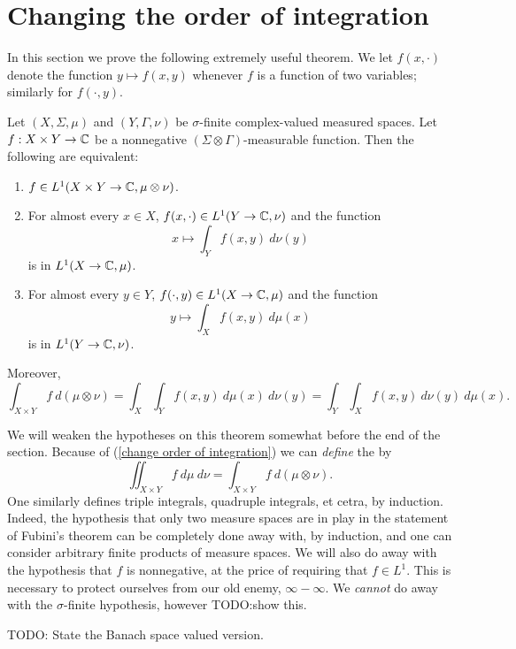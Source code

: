 \section{Changing the order of integration}
In this section we prove the following extremely useful theorem.
We let $f(x, \cdot)$ denote the function $y \mapsto f(x, y)$ whenever $f$ is a function of two variables; similarly for $f(\cdot, y)$.
\begin{theorem}[Fubini]
Let $(X, \Sigma, \mu)$ and $(Y, \Gamma, \nu)$ be $\sigma$-finite complex-valued measured spaces.
Let $f: X \times Y \to \mathbb{C}$ be a nonnegative $(\Sigma \otimes \Gamma)$-measurable function.
Then the following are equivalent:
\begin{enumerate}
\item $f \in L^1(X \times Y \to \mathbb{C}, \mu \otimes \nu)$.
\item For almost every $x \in X$, $f(x, \cdot) \in L^1(Y \to \mathbb{C}, \nu)$ and the function
\[x \mapsto \int_{Y} f(x, y)~d\nu(y)\]
is in $L^1(X \to \mathbb{C}, \mu)$.
\item For almost every $y \in Y$, $f(\cdot, y) \in L^1(X \to \mathbb{C}, \mu)$ and the function
\[y \mapsto \int_{X} f(x, y)~d\mu(x)\]
is in $L^1(Y \to \mathbb{C}, \nu)$.
\end{enumerate}
Moreover,
\begin{equation}
\label{change order of integration}
\int_{X \times Y} f~d(\mu \otimes \nu) = \int_{X} \int_{Y} f(x, y) ~d\mu(x)~d\nu(y) = \int_{Y} \int_{X} f(x, y) ~d\nu(y) ~d\mu(x).
\end{equation}
\end{theorem}
We will weaken the hypotheses on this theorem somewhat before the end of the section.
Because of (\ref{change order of integration}) we can \emph{define} the  by
\[\iint_{X \times Y} f ~d\mu ~d\nu = \int_{X \times Y} f~d(\mu \otimes \nu).\]
One similarly defines triple integrals, quadruple integrals, et cetra, by induction.
Indeed, the hypothesis that only two measure spaces are in play in the statement of Fubini's theorem can be completely done away with, by induction, and one can consider arbitrary finite products of measure spaces.
We will also do away with the hypothesis that $f$ is nonnegative, at the price of requiring that $f \in L^1$.
This is necessary to protect ourselves from our old enemy, $\infty - \infty$.
We \emph{cannot} do away with the $\sigma$-finite hypothesis, however TODO:show this.

TODO: State the Banach space valued version.

